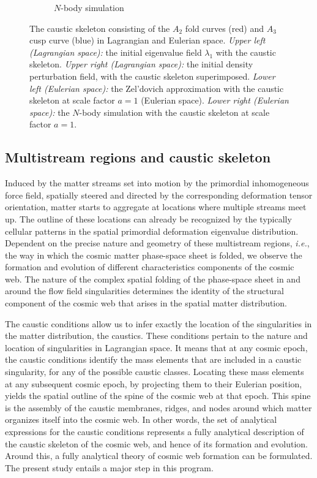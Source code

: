 \documentclass[a4paper, 11pt]{article}
\begin{document}
\begin{figure}
\begin{subfigure}[b]{0.49\textwidth}
\caption{$N$-body simulation}
\end{subfigure}
\caption{The caustic skeleton consisting of the $A_2$ fold curves (red) and $A_3$ cusp curve (blue) in Lagrangian and Eulerian space. \textit{Upper left (Lagrangian space):} the initial eigenvalue field $\lambda_1$ with the caustic skeleton. \textit{Upper right (Lagrangian space):} the initial density perturbation field, with the caustic skeleton superimposed. \textit{Lower left (Eulerian space):} the Zel'dovich approximation with the caustic skeleton at scale factor $a=1$ (Eulerian space). \textit{Lower right (Eulerian space):}  the $N$-body simulation with the caustic skeleton at scale factor $a=1$.}
\label{fig:Eulerian}
\end{figure}

\subsection{Multistream regions and caustic skeleton}
Induced by the matter streams set into motion by the primordial inhomogeneous force field, spatially steered and directed by the corresponding deformation tensor orientation, matter starts to aggregate at locations where multiple streams meet up. The outline of these locations can already be recognized by the typically cellular patterns in the spatial primordial deformation eigenvalue distribution. Dependent on the precise nature and geometry of these multistream regions, \textit{i.e.}, the way in which the cosmic matter phase-space sheet is folded, we observe the formation and evolution of different characteristics components of the cosmic web. The nature of the complex spatial folding of the phase-space sheet in and around the flow field singularities determines the identity of the structural component of the cosmic web that arises in the spatial matter distribution.

The caustic conditions \cite{Feldbrugge:2018} allow us to infer exactly the location of the singularities in the matter distribution, the caustics. These conditions pertain to the nature and location of singularities in Lagrangian space. It means that at any cosmic epoch, the caustic conditions identify the mass elements that are included in a caustic singularity, for any of the possible caustic classes. Locating these mass elements at any subsequent cosmic epoch, by projecting them to their Eulerian position, yields the spatial outline of the spine of the cosmic web at that epoch. This spine is the assembly of the caustic membranes, ridges, and nodes around which matter organizes itself into the cosmic web. In other words, the set of analytical expressions for the caustic conditions represents a fully analytical description of the caustic skeleton of the cosmic web, and hence of its formation and evolution. Around this, a fully analytical theory of cosmic web formation can be formulated. The present study entails a major step in this program. 
\end{document}
